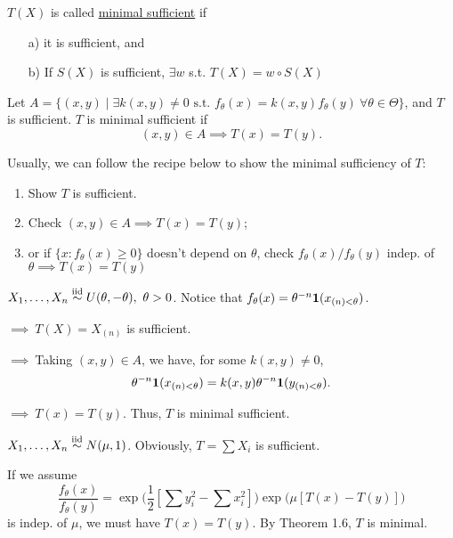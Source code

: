 \begin{mydef}
	$T(X)$ is called \underline{minimal sufficient} if 
	\begin{enumerate}
		\item[a)] it is sufficient, and
		\item[b)] If $S(X)$ is sufficient, $\exists w$ s.t. $T(X) = w\circ S(X)$
	\end{enumerate}
\end{mydef}
{\color{blue}
\begin{thm}
	Let $A = \{  (x,y)\mid \exists k(x,y)\neq 0 \text{ s.t. } f_\theta (x) = k(x,y) f_\theta (y) \ \forall \theta\in \Theta \}$, and $T$ is sufficient. $T$ is minimal sufficient if 
	$$(x,y) \in A \implies T(x) = T(y).$$
\end{thm}}
\begin{remark}
	Usually, we can follow the recipe below to show the minimal sufficiency of $T$:
	\begin{enumerate}
		\item Show $T$ is sufficient.
		\item Check $(x,y) \in A \implies T(x) = T(y)$;
		\item or if $\{ x:f_\theta (x)\geq 0 \}$ doesn't depend on $\theta$, check $f_\theta(x)/f_\theta(y)$ indep. of $\theta \implies T(x)=T(y)$
	\end{enumerate}
\end{remark}

\begin{exap} $X_1,\dots,X_n \stackrel{\text{iid}}{\sim} U(\theta, -\theta), \ \theta>0$.  Notice that $f_\theta (x) = \theta^{-n} \boldsymbol{1}(x_{(n) < \theta } )$. 
	
	$\implies \ T(X) = X_{(n)}$ is sufficient. 
	
	$\implies \ $Taking $(x,y) \in A$, we have, for some $k(x,y) \neq 0$, 
	$$\theta^{-n} \boldsymbol{1}(x_{(n) < \theta } ) =  k(x,y)  \theta^{-n} \boldsymbol{1}(y_{(n) < \theta } ).$$
	
	$\implies \ T(x) = T(y)$. Thus, $T$ is minimal sufficient.
\end{exap}

\begin{exap} $X_1,\dots,X_n \stackrel{\text{iid}}{\sim} N(\mu, 1)$. Obviously, $T = \sum X_i$ is sufficient.
	
	If we assume
	$$\frac{f_\theta (x)}{f_\theta (y)} = \exp \Big( \frac{1}{2}[\sum y_i^2 - \sum x_i^2]  \Big) \exp \Big( \mu [T(x) - T(y)] \Big)$$
	is indep. of $\mu$, we must have $T(x) = T(y)$. By Theorem 1.6, $T$ is minimal.
	
\end{exap}

